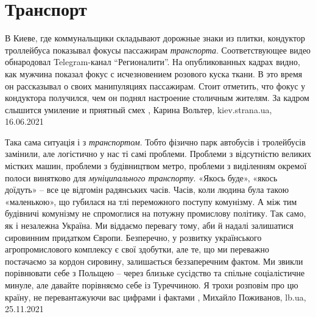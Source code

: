  
 
 
 
 
\chapter{Транспорт}
\label{sec:slova.transport}

В Киеве, где коммунальщики складывают дорожные знаки из плитки, кондуктор
троллейбуса показывал фокусы пассажирам \emph{транспорта}.  Соответствующее видео
обнародовал Telegram-канал \enquote{Регионалити}.  На опубликованных кадрах видно, как
мужчина показал фокус с исчезновением розового куска ткани. В это время он
рассказывал о своих манипуляциях пассажирам. Стоит отметить, что фокус у
кондуктора получился, чем он поднял настроение столичным жителям. За кадром
слышится умиление и приятный смех
, 
Карина Вольтер, kiev.strana.ua, 16.06.2021

Така сама ситуація і з \emph{транспортом}. Тобто фізично парк автобусів і
тролейбусів замінили, але логістично у нас ті самі проблеми. Проблеми з
відсутністю великих містких машин, проблеми з будівництвом метро, проблеми з
виділенням окремої полоси винятково для \emph{муніципального транспорту}.
«Якось буде», «якось доїдуть» – все це відгомін радянських часів. Часів, коли
людина була такою «маленькою», що губилася на тлі переможного поступу
комунізму.  А між тим будівничі комунізму не спромоглися на потужну промислову
політику.  Так само, як і незалежна Україна. Ми віддаємо перевагу тому, аби й
надалі залишатися сировинним придатком Європи. Безперечно, у розвитку
українського агропромислового комплексу є свої здобутки, але те, що ми
переважно постачаємо за кордон сировину, залишається беззаперечним фактом.  Ми
звикли порівнювати себе з Польщею – через близьке сусідство та спільне
соціалістичне минуле, але давайте порівняємо себе із Туреччиною. Я трохи
розповім про цю країну, не перевантажуючи вас цифрами і фактами
, Михайло Поживанов, lb.ua, 25.11.2021
